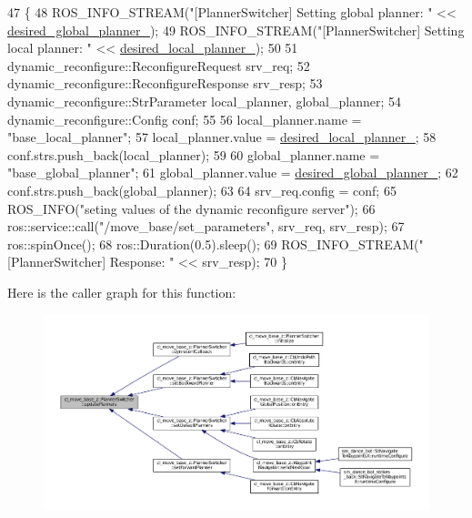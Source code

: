 \begin{DoxyCode}
47 \{
48   ROS\_INFO\_STREAM(\textcolor{stringliteral}{"[PlannerSwitcher] Setting global planner: "} << 
      \hyperlink{classcl__move__base__z_1_1PlannerSwitcher_aef047d3778b2993c1df146bbad43e03d}{desired\_global\_planner\_});
49   ROS\_INFO\_STREAM(\textcolor{stringliteral}{"[PlannerSwitcher] Setting local planner: "} << 
      \hyperlink{classcl__move__base__z_1_1PlannerSwitcher_a6cbf65f11bb69125f913caaabdf7b4cf}{desired\_local\_planner\_});
50 
51   dynamic\_reconfigure::ReconfigureRequest srv\_req;
52   dynamic\_reconfigure::ReconfigureResponse srv\_resp;
53   dynamic\_reconfigure::StrParameter local\_planner, global\_planner;
54   dynamic\_reconfigure::Config conf;
55 
56   local\_planner.name = \textcolor{stringliteral}{"base\_local\_planner"};
57   local\_planner.value = \hyperlink{classcl__move__base__z_1_1PlannerSwitcher_a6cbf65f11bb69125f913caaabdf7b4cf}{desired\_local\_planner\_};
58   conf.strs.push\_back(local\_planner);
59 
60   global\_planner.name = \textcolor{stringliteral}{"base\_global\_planner"};
61   global\_planner.value = \hyperlink{classcl__move__base__z_1_1PlannerSwitcher_aef047d3778b2993c1df146bbad43e03d}{desired\_global\_planner\_};
62   conf.strs.push\_back(global\_planner);
63 
64   srv\_req.config = conf;
65   ROS\_INFO(\textcolor{stringliteral}{"seting values of the dynamic reconfigure server"});
66   ros::service::call(\textcolor{stringliteral}{"/move\_base/set\_parameters"}, srv\_req, srv\_resp);
67   ros::spinOnce();
68   ros::Duration(0.5).sleep();
69   ROS\_INFO\_STREAM(\textcolor{stringliteral}{"[PlannerSwitcher] Response: "} << srv\_resp);
70 \}
\end{DoxyCode}


Here is the caller graph for this function\+:
\nopagebreak
\begin{figure}[H]
\begin{center}
\leavevmode
\includegraphics[width=350pt]{classcl__move__base__z_1_1PlannerSwitcher_a146641f63aea3185daab4c5cbb789550_icgraph}
\end{center}
\end{figure}




